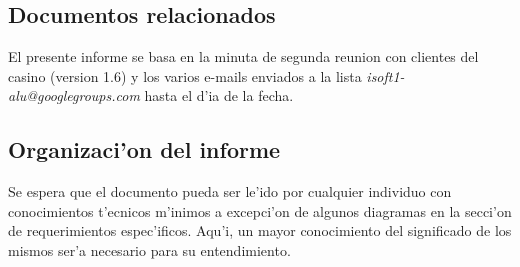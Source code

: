 \subsection{ Documentos relacionados}
El presente informe se basa en la minuta de segunda reunion con clientes del casino (version 1.6) y los varios e-mails enviados a la lista \textit{isoft1-alu@googlegroups.com} hasta el d'ia de la fecha.


\subsection{ Organizaci'on del informe	}
Se espera que el documento pueda ser le'ido por cualquier individuo con conocimientos t'ecnicos m'inimos a excepci'on de algunos diagramas en la secci'on de requerimientos espec'ificos. Aqu'i, un mayor conocimiento del significado de los mismos ser'a necesario para su entendimiento.
